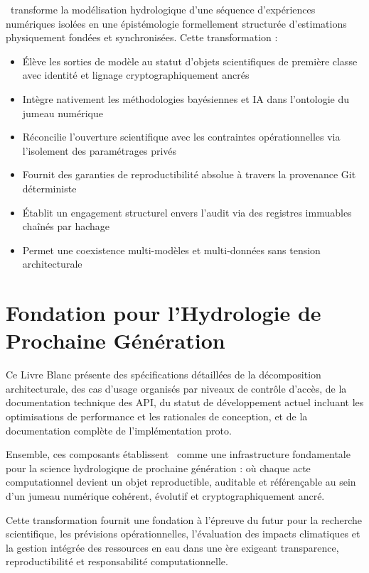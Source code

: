 \hydrot\ transforme la modélisation hydrologique d'une séquence d'expériences numériques isolées en une épistémologie formellement structurée d'estimations physiquement fondées et synchronisées. Cette transformation :

\begin{itemize}
\item Élève les sorties de modèle au statut d'objets scientifiques de première classe avec identité et lignage cryptographiquement ancrés
\item Intègre nativement les méthodologies bayésiennes et IA dans l'ontologie du jumeau numérique
\item Réconcilie l'ouverture scientifique avec les contraintes opérationnelles via l'isolement des paramétrages privés
\item Fournit des garanties de reproductibilité absolue à travers la provenance Git déterministe
\item Établit un engagement structurel envers l'audit via des registres immuables chaînés par hachage
\item Permet une coexistence multi-modèles et multi-données sans tension architecturale
\end{itemize}

\section*{Fondation pour l'Hydrologie de Prochaine Génération}

Ce Livre Blanc présente des spécifications détaillées de la décomposition architecturale, des cas d'usage organisés par niveaux de contrôle d'accès, de la documentation technique des API, du statut de développement actuel incluant les optimisations de performance et les rationales de conception, et de la documentation complète de l'implémentation proto.

Ensemble, ces composants établissent \hydrot\ comme une infrastructure fondamentale pour la science hydrologique de prochaine génération : où chaque acte computationnel devient un objet reproductible, auditable et référençable au sein d'un jumeau numérique cohérent, évolutif et cryptographiquement ancré.

Cette transformation fournit une fondation à l'épreuve du futur pour la recherche scientifique, les prévisions opérationnelles, l'évaluation des impacts climatiques et la gestion intégrée des ressources en eau dans une ère exigeant transparence, reproductibilité et responsabilité computationnelle.

\newpage
